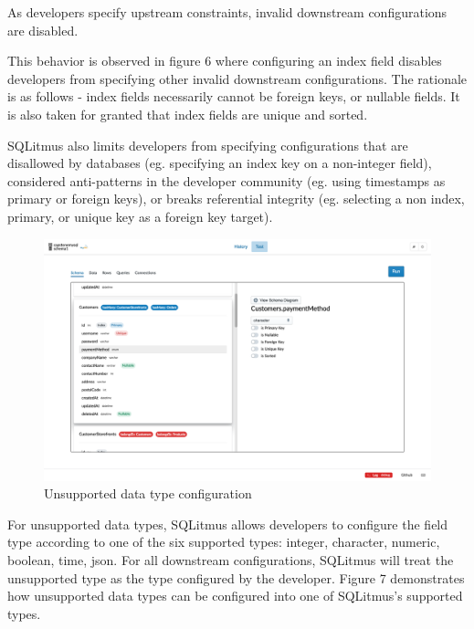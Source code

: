 \documentclass[12pt]{article}
\begin{document}
\begin{spacing}{1.9}
		As developers specify upstream constraints, invalid downstream configurations are disabled.
		
		This behavior is observed in figure 6 where configuring an index field disables developers from specifying other invalid downstream configurations. The rationale is as follows - index fields necessarily cannot be foreign keys, or nullable fields. It is also taken for granted that index fields are unique and sorted.
		
		SQLitmus also limits developers from specifying configurations that are disallowed by databases (eg. specifying an index key on a non-integer field), considered anti-patterns in the developer community (eg. using timestamps as primary or foreign keys), or breaks referential integrity (eg. selecting a non index, primary, or unique key as a foreign key target). 
		
		
		\begin{figure}[H]
			\centering
			\includegraphics[width=\textwidth]{3-2-1c.png}
			\caption{Unsupported data type configuration}
			
		\end{figure}
		
		For unsupported data types, SQLitmus allows developers to configure the field type according to one of the six supported types: integer, character, numeric, boolean, time, json. For all downstream configurations, SQLitmus will treat the unsupported type as the type configured by the developer. Figure 7 demonstrates how unsupported data types can be configured into one of SQLitmus's supported types.
		
		
		

\end{spacing}
\end{document}

